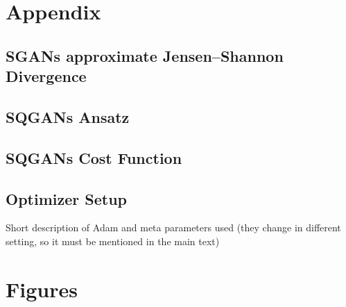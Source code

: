\chapter{Appendix}

\section{SGANs approximate Jensen–Shannon Divergence}
\label{apx:JSD}




\section{SQGANs Ansatz}
\label{apx:sqgans_ansatz}

\section{SQGANs Cost Function}
\label{apx:sqgans_cost_function}

\section{Optimizer Setup}
\label{apx:optimizer_setup}
Short description of Adam and meta parameters used (they change in different
setting, so it must be mentioned in the main text)
\chapter{Figures}
